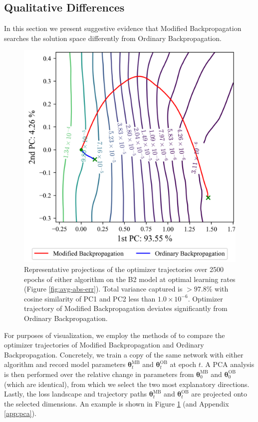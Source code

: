 \documentclass{article}
\theoremstyle{plain}
\theoremstyle{definition}
\theoremstyle{remark}
\newcommand{\vtheta}{\bm{\theta}}
\begin{document}

\subsection{Qualitative Differences}
\label{sec:experiment-qual}
%
In this section we present suggestive evidence that Modified Backpropagation searches the solution space differently from Ordinary Backpropagation.
%
\begin{figure}[t]
    \centering
    \includegraphics[width=0.85\columnwidth]{./resources/pca_b2.png}
    \caption{Representative projections of the optimizer trajectories over 2500 epochs of either algorithm on the B2 model at optimal learning rates (Figure \ref{fig:avg-abs-err}). Total variance captured is $>97.8\%$ with cosine similarity of PC1 and PC2 less than $1.0\times10^{-6}$. Optimizer trajectory of Modified Backpropagation deviates significantly from Ordinary Backpropagation.}
    \label{fig:pca-b2}
\end{figure}

For purposes of visualization, we employ the methods of \citealt{li-visualizing} to compare the optimizer trajectories of Modified Backpropagation and Ordinary Backpropagation. Concretely, we train a copy of the same network with either algorithm and record model parameters $\vtheta_t^{\mathrm{MB}}$ and $\vtheta_t^{\mathrm{OB}}$ at epoch $t$. A PCA analysis is then performed over the relative change in parameters from $\vtheta_0^{\mathrm{MB}}$ and $\vtheta_0^{\mathrm{OB}}$ (which are identical), from which we select the two most explanatory directions. Lastly, the loss landscape and trajectory paths $\vtheta_t^{\mathrm{MB}}$ and $\vtheta_t^{\mathrm{OB}}$ are projected onto the selected dimensions. An example is shown in Figure \ref{fig:pca-b2} (and Appendix \ref{app:pca}).
\end{document}
